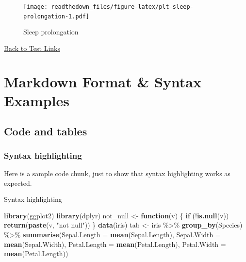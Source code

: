 \documentclass[
]{article}
\newenvironment{Shaded}{\begin{snugshade}}{\end{snugshade}}
\newcommand{\ControlFlowTok}[1]{\textcolor[rgb]{0.12,0.11,0.11}{\textbf{#1}}}
\newcommand{\DataTypeTok}[1]{\textcolor[rgb]{0.00,0.34,0.68}{#1}}
\newcommand{\KeywordTok}[1]{\textcolor[rgb]{0.12,0.11,0.11}{\textbf{#1}}}
\newcommand{\NormalTok}[1]{\textcolor[rgb]{0.12,0.11,0.11}{#1}}
\newcommand{\OperatorTok}[1]{\textcolor[rgb]{0.12,0.11,0.11}{#1}}
\newcommand{\StringTok}[1]{\textcolor[rgb]{0.75,0.01,0.01}{#1}}
\begin{document}
\begin{figure}
\centering
\texttt{[image: readthedown\_files/figure-latex/plt-sleep-prolongation-1.pdf]}
\caption{Sleep prolongation}
\end{figure}

\protect\hyperlink{sec:test}{Back to Test Links}

\hypertarget{markdown-format-syntax-examples}{%
\section{Markdown Format \& Syntax
Examples}\label{markdown-format-syntax-examples}}

\hypertarget{code-and-tables}{%
\subsection{Code and tables}\label{code-and-tables}}

\hypertarget{syntax-highlighting}{%
\subsubsection{Syntax highlighting}\label{syntax-highlighting}}

Here is a sample code chunk, just to show that syntax highlighting works
as expected.

\begin{codelisting}

\caption{Syntax highlighting}

\hypertarget{lst:syntax_highlighting}{%
\label{lst:syntax_highlighting}}%
\begin{Shaded}
\begin{Highlighting}[]
\KeywordTok{library}\NormalTok{(ggplot2)}
\KeywordTok{library}\NormalTok{(dplyr)}
\NormalTok{not\_null \textless{}{-}}\StringTok{ }\ControlFlowTok{function}\NormalTok{(v) \{}
    \ControlFlowTok{if}\NormalTok{ (}\OperatorTok{!}\KeywordTok{is.null}\NormalTok{(v)) }
        \KeywordTok{return}\NormalTok{(}\KeywordTok{paste}\NormalTok{(v, }\StringTok{"not null"}\NormalTok{))}
\NormalTok{\}}
\KeywordTok{data}\NormalTok{(iris)}
\NormalTok{tab \textless{}{-}}\StringTok{ }\NormalTok{iris }\OperatorTok{\%\textgreater{}\%}\StringTok{ }\KeywordTok{group\_by}\NormalTok{(Species) }\OperatorTok{\%\textgreater{}\%}\StringTok{ }\KeywordTok{summarise}\NormalTok{(}\DataTypeTok{Sepal.Length =} \KeywordTok{mean}\NormalTok{(Sepal.Length), }\DataTypeTok{Sepal.Width =} \KeywordTok{mean}\NormalTok{(Sepal.Width), }\DataTypeTok{Petal.Length =} \KeywordTok{mean}\NormalTok{(Petal.Length), }
    \DataTypeTok{Petal.Width =} \KeywordTok{mean}\NormalTok{(Petal.Length))}
\end{Highlighting}
\end{Shaded}

\end{codelisting}
\end{document}
